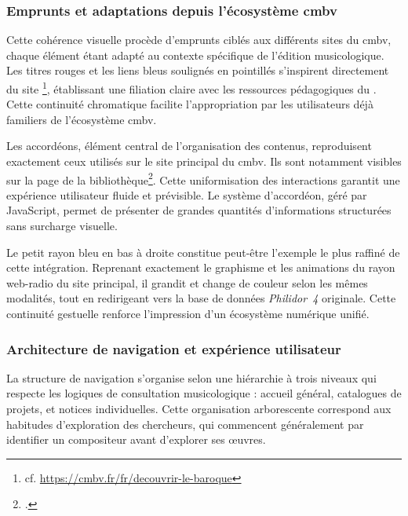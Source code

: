 \subsubsection{Emprunts et adaptations depuis l'écosystème \gls{cmbv}}

Cette cohérence visuelle procède d'emprunts ciblés aux différents sites du \gls{cmbv}, chaque élément étant adapté au contexte spécifique de l'édition musicologique. Les titres rouges et les liens bleus soulignés en pointillés s'inspirent directement du site \footnote{cf. \url{https://cmbv.fr/fr/decouvrir-le-baroque}}, établissant une filiation claire avec les ressources pédagogiques du . Cette continuité chromatique facilite l'appropriation par les utilisateurs déjà familiers de l'écosystème \gls{cmbv}.

Les accordéons, élément central de l'organisation des contenus, reproduisent exactement ceux utilisés sur le site principal du \gls{cmbv}. Ils sont notamment visibles sur la page de la bibliothèque\footcite{CentreMusiqueBaroqueb}. Cette uniformisation des interactions garantit une expérience utilisateur fluide et prévisible. Le système d'accordéon, géré par JavaScript, permet de présenter de grandes quantités d'informations structurées sans surcharge visuelle.

Le petit rayon bleu en bas à droite constitue peut-être l'exemple le plus raffiné de cette intégration. Reprenant exactement le graphisme et les animations du rayon web-radio du site principal, il grandit et change de couleur selon les mêmes modalités, tout en redirigeant vers la base de données \textit{Philidor~4} originale. Cette continuité gestuelle renforce l'impression d'un écosystème numérique unifié.

\subsubsection{Architecture de navigation et expérience utilisateur}

La structure de navigation s'organise selon une hiérarchie à trois niveaux qui respecte les logiques de consultation musicologique : accueil général, catalogues de projets, et notices individuelles. Cette organisation arborescente correspond aux habitudes d'exploration des chercheurs, qui commencent généralement par identifier un compositeur avant d'explorer ses œuvres.

